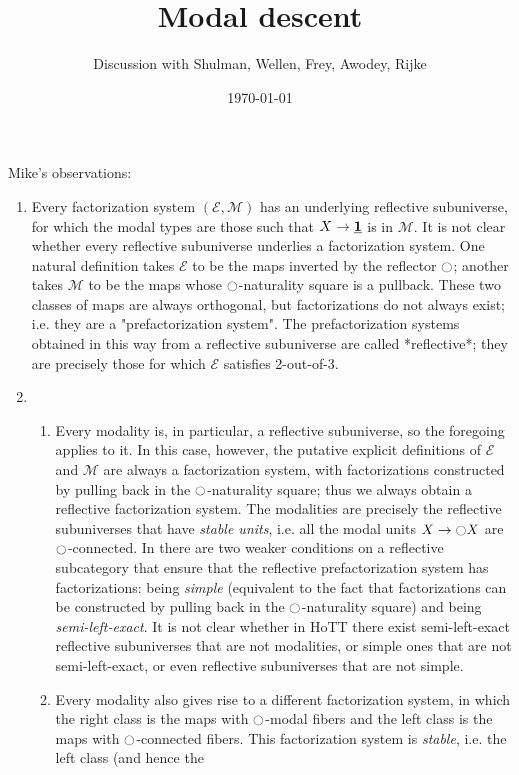 \documentclass[9pt,twosided]{amsart}
\title{Modal descent}
\author{Discussion with Shulman, Wellen, Frey, Awodey, Rijke}
\date{\today}
\begin{document}
\maketitle

Mike's observations:
\begin{enumerate}
\item Every factorization system $(\mathcal{E},\mathcal{M})$ has an underlying reflective
subuniverse, for which the modal types are those such that $X\to \underline{\mathbf{1}}$ is
in $\mathcal{M}$.  It is not clear whether every reflective subuniverse underlies
a factorization system.  One natural definition takes $\mathcal{E}$ to be the maps
inverted by the reflector ${\ocircle}$; another takes $\mathcal{M}$ to be the maps whose
${\ocircle}$-naturality square is a pullback.  These two classes of maps are
always orthogonal, but factorizations do not always exist; i.e. they
are a "prefactorization system".  The prefactorization systems
obtained in this way from a reflective subuniverse are called
*reflective*; they are precisely those for which $\mathcal{E}$ satisfies
2-out-of-3.
\item 
\begin{enumerate}
\item Every modality is, in particular, a reflective subuniverse, so the
foregoing applies to it.  In this case, however, the putative explicit
definitions of $\mathcal{E}$ and $\mathcal{M}$ are always a factorization system, with
factorizations constructed by pulling back in the ${\ocircle}$-naturality square;
thus we always obtain a reflective factorization system.  The
modalities are precisely the reflective subuniverses that have \emph{stable
units}, i.e. all the modal units $X\to{\ensuremath{\ocircle}} X$ are ${\ocircle}$-connected.  In \cite{CassidyHebertKelly}
there are two weaker conditions on a reflective subcategory that
ensure that the reflective prefactorization system has factorizations:
being \emph{simple} (equivalent to the fact that factorizations can be
constructed by pulling back in the ${\ocircle}$-naturality square) and being
\emph{semi-left-exact}.  It is not clear whether in HoTT there exist
semi-left-exact reflective subuniverses that are not modalities, or
simple ones that are not semi-left-exact, or even reflective
subuniverses that are not simple.
\item Every modality also gives rise to a different factorization
system, in which the right class is the maps with ${\ocircle}$-modal fibers and
the left class is the maps with ${\ocircle}$-connected fibers.  This
factorization system is \emph{stable}, i.e. the left class (and hence the

\end{enumerate}
\end{enumerate}
\end{document}
